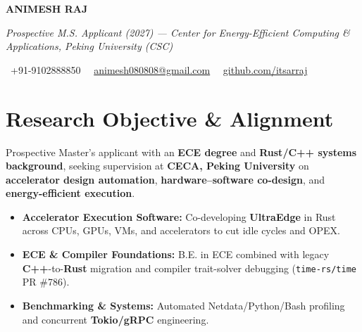 \documentclass[a4paper,11pt]{article}
\newcommand{\socialicon}[1]{\raisebox{-0.05em}{\resizebox{!}{1em}{#1}}}
\newcommand{\headerfontiii}{\fontfamily{ppl}\selectfont} %
\begin{document}
\headerfontiii

\begin{center}
    {\Huge\textbf{ANIMESH RAJ}}
\end{center}
\vspace{-6mm}

\begin{center}
    {\small\textit{Prospective M.S. Applicant (2027) --- Center for Energy-Efficient Computing \& Applications, Peking University (CSC)}}
\end{center}
\vspace{-6mm}

\begin{center}
    {\small
    \socialicon{\faPhone}\ +91-9102888850 \textbar\ 
    \socialicon{\faEnvelope}\ \href{mailto:animesh080808@gmail.com}{animesh080808@gmail.com} \textbar\ 
    \socialicon{\faGithub}\ \href{https://github.com/itsarraj}{github.com/itsarraj}
    }
\end{center}
\vspace{-4mm}

\section{\textbf{Research Objective \& Alignment}}
\vspace{1mm}
{\small
Prospective Master's applicant with an \textbf{ECE degree} and \textbf{Rust/C++ systems background}, seeking supervision at \textbf{CECA, Peking University} on \textbf{accelerator design automation}, \textbf{hardware–software co-design}, and \textbf{energy-efficient execution}.
\begin{itemize}[leftmargin=3ex, itemsep=0.4mm, topsep=1mm]
    \item \textbf{Accelerator Execution Software:} Co-developing \textbf{UltraEdge} in Rust across CPUs, GPUs, VMs, and accelerators to cut idle cycles and OPEX.
    \item \textbf{ECE \& Compiler Foundations:} B.E. in ECE combined with legacy \textbf{C++}-to-\textbf{Rust} migration and compiler trait-solver debugging (\texttt{time-rs/time} PR \#786).
    \item \textbf{Benchmarking \& Systems:} Automated Netdata/Python/Bash profiling and concurrent \textbf{Tokio/gRPC} engineering.
\end{itemize}
}
\vspace{-3mm}
\end{document}
